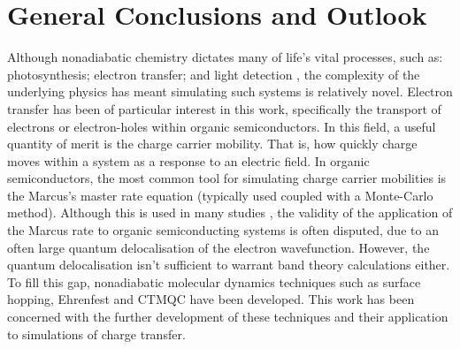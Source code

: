 \chapter{General Conclusions and Outlook}
\label{chap:outlook}
Although nonadiabatic chemistry dictates many of life's vital processes, such as: photosynthesis; electron transfer; and light detection \cite{Dral2018}, the complexity of the underlying physics has meant simulating such systems is relatively novel. Electron transfer has been of particular interest in this work, specifically the transport of electrons or electron-holes within organic semiconductors. In this field, a useful quantity of merit is the charge carrier mobility. That is, how quickly charge moves within a system as a response to an electric field. In organic semiconductors, the most common tool for simulating charge carrier mobilities is the Marcus's master rate equation (typically used coupled with a Monte-Carlo method). Although this is used in many studies \cite{Marcus1, Marcus2, Marcus3, Marcus4, Marcus5, Marcus6, Marcus6, Marcus7, Marcus8}, the validity of the application of the Marcus rate to organic semiconducting systems is often disputed, due to an often large quantum delocalisation of the electron wavefunction. However, the quantum delocalisation isn't sufficient to warrant band theory calculations either. To fill this gap, nonadiabatic molecular dynamics techniques such as surface hopping, Ehrenfest and CTMQC have been developed. This work has been concerned with the further development of these techniques and their application to simulations of charge transfer.
\\\\
